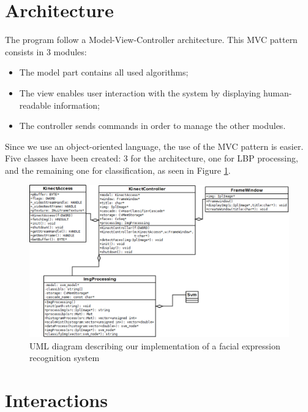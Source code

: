 \section{Architecture}

\vspace{\baselineskip}
\noindent The program follow a Model-View-Controller architecture. This MVC pattern consists in 3 modules:

\begin{itemize}
  \item The model part contains all used algorithms;
  \item The view enables user interaction with the system by displaying human-readable information;
  \item The controller sends commands in order to manage the other modules.
\end{itemize}

\noindent Since we use an object-oriented language, the use of the MVC pattern is easier. Five classes have been created: 3 for the architecture, one for LBP processing, and the remaining one for classification, as seen in Figure \ref{uml}.
\newline

\begin{figure}[!h]
\begin{center}
\noindent \includegraphics[scale=0.4]{figures/UML} 
\newline
\caption{UML diagram describing our implementation of a facial expression recognition system}
\label{uml}
\end{center} 
\end{figure}

\section{Interactions}


